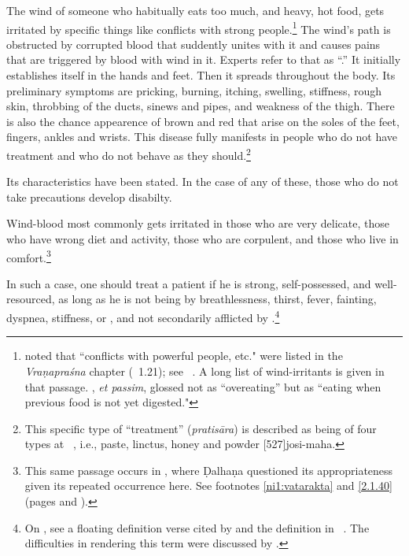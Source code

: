\begin{translation}
    The wind of someone who habitually eats too much, and heavy, hot food,
    gets irritated by specific things like conflicts with  strong
    people.\footnote{ noted that “conflicts with
        powerful people, etc." were listed in the \emph{Vraṇapraśna} chapter
        (\SS\ 1.21); see \SS\ . A long list of wind-irritants
        is given in that passage.  , \emph{et passim},
        glossed  not as “overeating” but as “eating when
        previous food is not yet digested."} The wind's path is obstructed by
    corrupted blood that suddently unites with it and causes pains that
    are triggered by blood with wind in it.  Experts refer to that as
    “.”  It initially establishes
    itself in the hands and feet.  Then it spreads throughout the body.
    Its preliminary symptoms are pricking, burning, itching, swelling,
    stiffness, rough skin, throbbing of the ducts, sinews and pipes, and
    weakness of the thigh. There is also the chance appearence of brown
    and red  that arise on the soles of the
    feet,
    fingers, ankles and wrists. This disease fully manifests in people who
    do not have treatment and who do not behave as they
    should.\footnote{This specific type of “treatment” (\emph{pratisāra})
        is described as being of four types at \SS\ , i.e.,
        paste, linctus, honey and powder [527]{josi-maha}.}

    Its characteristics have been stated.   In the case of any of these,
    those who do not take precautions develop disabilty.


    \item[5]

    Wind-blood most commonly gets irritated in those who are very
    delicate, those who have wrong diet and activity, those who are
    corpulent,
    and those who live in comfort.\footnote{This same passage
        occurs in , where Ḍalhaṇa questioned its
        appropriateness given its repeated occurrence here.  See footnotes
        \ref{ni1:vatarakta} and \ref{2.1.40} (pages
        \pageref{ni1:vatarakta}
        and \pageref{2.1.40}).}

    \item[6]

    In such a case, one should treat a patient if he is strong,
    self-possessed, and well-resourced, as long as he is not being
     by breathlessness, thirst, fever,
    fainting, dyspnea, stiffness, or ,  and not secondarily afflicted by
    .\footnote{On , see a floating definition verse cited by
         and the definition in \CS\
        . The difficulties in rendering this term were
        discussed by \citet[447--448]{meul-1974}.

}
\end{translation}
